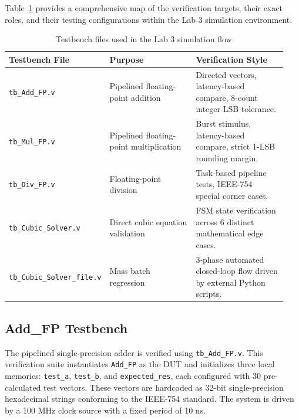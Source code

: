 Table~\ref{tab:testbench_file_map} provides a comprehensive map of the verification targets, their exact roles, and their testing configurations within the Lab 3 simulation environment.

\begin{table}[H]
\centering
\renewcommand{\arraystretch}{1.2}
\begin{tabular}{p{0.28\linewidth} p{0.32\linewidth} p{0.34\linewidth}}
\toprule
\textbf{Testbench File} & \textbf{Purpose} & \textbf{Verification Style} \\
\midrule
\texttt{tb\_Add\_FP.v} & Pipelined floating-point addition & Directed vectors, latency-based compare, 8-count integer LSB tolerance. \\
\texttt{tb\_Mul\_FP.v} & Pipelined floating-point multiplication & Burst stimulus, latency-based compare, strict 1-LSB rounding margin. \\
\texttt{tb\_Div\_FP.v} & Floating-point division & Task-based pipeline tests, IEEE-754 special corner cases. \\
\texttt{tb\_Cubic\_Solver.v} & Direct cubic equation validation & FSM state verification across 6 distinct mathematical edge cases. \\
\texttt{tb\_Cubic\_Solver\_file.v} & Mass batch regression & 3-phase automated closed-loop flow driven by external Python scripts. \\
\bottomrule
\end{tabular}
\caption{Testbench files used in the Lab 3 simulation flow}
\label{tab:testbench_file_map}
\end{table}

\subsection{Add\_FP Testbench}

The pipelined single-precision adder is verified using \texttt{tb\_Add\_FP.v}. This verification suite instantiates \texttt{Add\_FP} as the DUT and initializes three local memories: \texttt{test\_a}, \texttt{test\_b}, and \texttt{expected\_res}, each configured with 30 pre-calculated test vectors. These vectors are hardcoded as 32-bit single-precision hexadecimal strings conforming to the IEEE-754 standard. The system is driven by a 100 MHz clock source with a fixed period of 10 ns.

